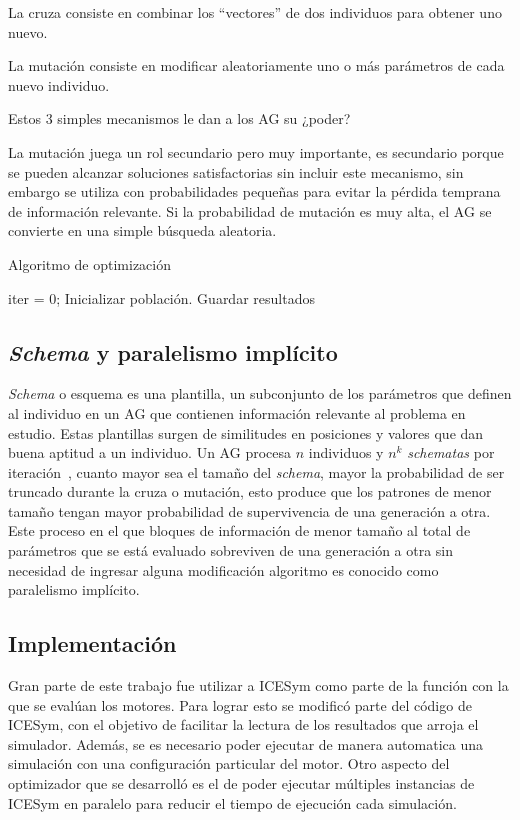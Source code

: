 La cruza consiste en combinar los ``vectores'' de dos individuos para obtener uno
nuevo.

La mutación consiste en modificar aleatoriamente uno o más parámetros de cada
nuevo individuo.

Estos 3 simples mecanismos le dan a los AG su ¿poder?

La mutación juega un rol secundario pero muy importante, es secundario porque se
pueden alcanzar soluciones satisfactorias sin incluir este mecanismo, sin
embargo se utiliza con probabilidades pequeñas para evitar la pérdida temprana
de información relevante.
%
Si la probabilidad de mutación es muy alta, el AG se convierte en una simple
búsqueda aleatoria.


\begin{algorithm}
 \caption{Algoritmo de optimización}\label{algo:genetico}
     \SetAlgoLined
     iter = 0;
     Inicializar población.\;
     {Guardar resultados\;}
\end{algorithm}


\subsection{\emph{Schema} y paralelismo implícito}

\emph{Schema} o esquema es una plantilla, un subconjunto de los parámetros que
definen al individuo en un AG que contienen información relevante al problema
en estudio.
%
Estas plantillas surgen de similitudes en posiciones y valores que dan buena
aptitud a un individuo.
%
Un AG procesa $n$ individuos y $n^k$ \emph{schematas} por
iteración~\cite{goldberg}, cuanto mayor sea el tamaño del \emph{schema}, mayor
la probabilidad de ser truncado durante la cruza o mutación, esto produce que
los
patrones de menor tamaño tengan mayor probabilidad de supervivencia de una
generación a otra.
%
Este proceso en el que bloques de información de menor tamaño al total de
parámetros que se está evaluado sobreviven de una generación a otra sin
necesidad de ingresar alguna modificación algoritmo es conocido como paralelismo
implícito.


\subsection{Implementación}
%
Gran parte de este trabajo fue utilizar a ICESym como parte de la función con la
que se evalúan los motores.
%
Para lograr esto se modificó parte del código de ICESym, con el objetivo de
facilitar la lectura de los resultados que arroja el simulador.
%
Además, se es necesario poder ejecutar de manera automatica una simulación con
una configuración particular del motor.
%
Otro aspecto del optimizador que se desarrolló es el de poder ejecutar múltiples
instancias de ICESym en paralelo para reducir el tiempo de ejecución cada
simulación.


